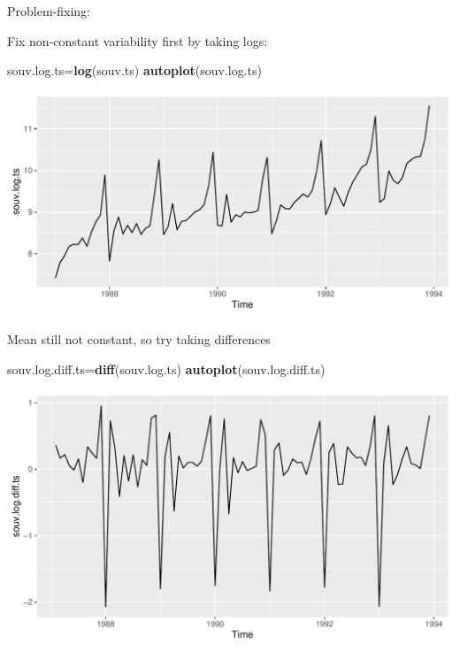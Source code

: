 \documentclass[ignorenonframetext,]{beamer}
\newenvironment{Shaded}{\begin{snugshade}}{\end{snugshade}}
\newcommand{\KeywordTok}[1]{\textcolor[rgb]{0.13,0.29,0.53}{\textbf{#1}}}
\newcommand{\NormalTok}[1]{#1}
\begin{document}
\begin{frame}[fragile]{Problem-fixing:}
\protect\hypertarget{problem-fixing}{}

Fix non-constant variability first by taking logs:

\begin{Shaded}
\begin{Highlighting}[]
\NormalTok{souv.log.ts=}\KeywordTok{log}\NormalTok{(souv.ts)}
\KeywordTok{autoplot}\NormalTok{(souv.log.ts)}
\end{Highlighting}
\end{Shaded}

\includegraphics{figure/unnamed-chunk-592-1.pdf}

\end{frame}

\begin{frame}[fragile]{Mean still not constant, so try taking
differences}
\protect\hypertarget{mean-still-not-constant-so-try-taking-differences}{}

\begin{Shaded}
\begin{Highlighting}[]
\NormalTok{souv.log.diff.ts=}\KeywordTok{diff}\NormalTok{(souv.log.ts)}
\KeywordTok{autoplot}\NormalTok{(souv.log.diff.ts)}
\end{Highlighting}
\end{Shaded}

\includegraphics{figure/unnamed-chunk-593-1.pdf}

\end{frame}
\end{document}
